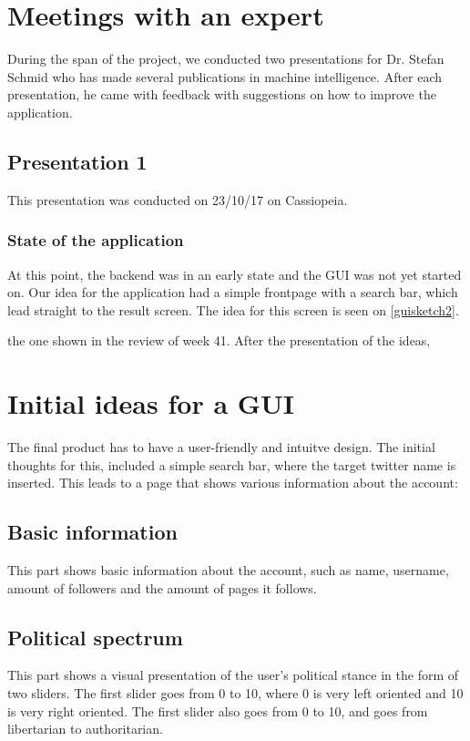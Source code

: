 \section{Meetings with an expert} \label{expMeeting}
During the span of the project, we conducted two presentations for Dr. Stefan
Schmid who has made several publications in machine intelligence. After
each presentation, he came with feedback with suggestions on how to improve the
application. 
\subsection{Presentation 1}
This presentation was conducted on 23/10/17 on Cassiopeia.
\subsubsection{State of the application}
At this point, the backend was in an early state and the \ac{GUI} was not yet
started on. Our idea for the application had a simple frontpage with a search
bar, which lead straight to the result screen. The idea for this screen is seen
on \autoref{guisketch2}.




 the one shown in the review of week 41.
After the presentation of the ideas,



\section{Initial ideas for a GUI} \label{sec:GUI}
The final product has to have a user-friendly and intuitve design. The initial
thoughts for this, included a simple search bar, where the target twitter name
is inserted. This leads to a page that shows various information about the
account:
\subsection*{Basic information}
This part shows basic information about the account, such as name, username,
amount of followers and the amount of pages it follows.
\subsection*{Political spectrum}
This part shows a visual presentation of the user's political stance in the form
of two sliders. The first slider goes from 0 to 10, where 0 is very left
oriented and 10 is very right oriented. The first slider also goes from 0 to 10,
and goes from libertarian to authoritarian.
